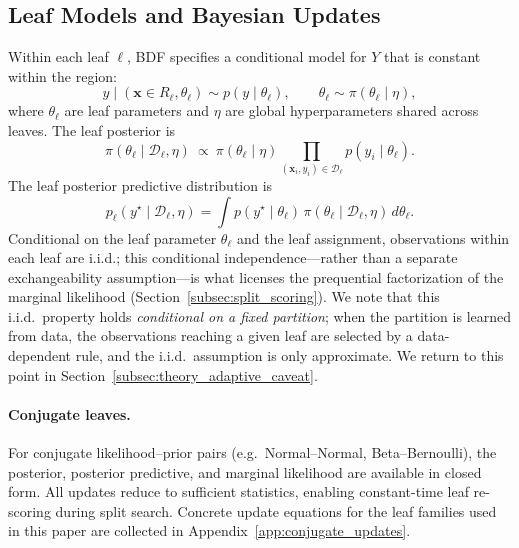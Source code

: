 \documentclass[twoside,11pt]{article}
\begin{document}
\subsection{Leaf Models and Bayesian Updates}\label{subsec:leaf_models}

Within each leaf $\ell$, BDF specifies a conditional model for $Y$ that is constant within the region:
\[
y \mid (\mathbf{x}\in R_\ell, \theta_\ell) \sim p(y \mid \theta_\ell),
\qquad
\theta_\ell \sim \pi(\theta_\ell \mid \eta),
\]
where $\theta_\ell$ are leaf parameters and $\eta$ are global hyperparameters shared across leaves.
The leaf posterior is
\[
\pi(\theta_\ell \mid \mathcal{D}_\ell, \eta)
\ \propto\
\pi(\theta_\ell \mid \eta)\prod_{(\mathbf{x}_i,y_i)\in\mathcal{D}_\ell} p(y_i\mid\theta_\ell).
\]
The leaf posterior predictive distribution is
\begin{equation}\label{eq:leaf_ppd}
p_\ell(y^\star \mid \mathcal{D}_\ell, \eta)
=
\int p(y^\star \mid \theta_\ell)\,\pi(\theta_\ell \mid \mathcal{D}_\ell,\eta)\,d\theta_\ell.
\end{equation}
Conditional on the leaf parameter $\theta_\ell$ and the leaf assignment, observations within each leaf are i.i.d.; this conditional independence---rather than a separate exchangeability assumption---is what licenses the prequential factorization of the marginal likelihood (Section~\ref{subsec:split_scoring}). We note that this i.i.d.\ property holds \emph{conditional on a fixed partition}; when the partition is learned from data, the observations reaching a given leaf are selected by a data-dependent rule, and the i.i.d.\ assumption is only approximate. We return to this point in Section~\ref{subsec:theory_adaptive_caveat}.

\paragraph{Conjugate leaves.}
For conjugate likelihood--prior pairs (e.g.\ Normal--Normal, Beta--Bernoulli), the posterior, posterior predictive, and marginal likelihood are available in closed form. All updates reduce to sufficient statistics, enabling constant-time leaf re-scoring during split search. Concrete update equations for the leaf families used in this paper are collected in Appendix~\ref{app:conjugate_updates}.
\end{document}

